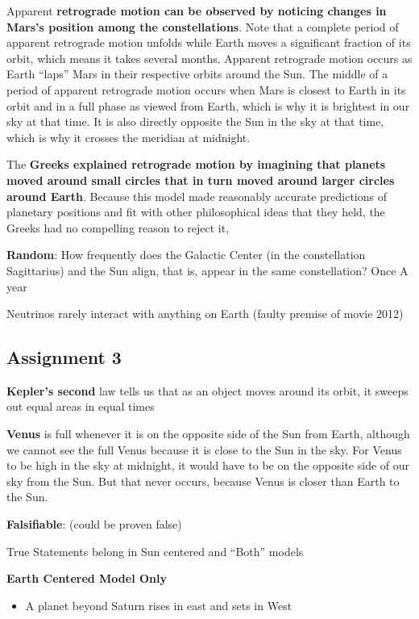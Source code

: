 Apparent {\bf retrograde motion can be observed by noticing changes in Mars's position among the constellations}. Note that a complete period of apparent retrograde motion unfolds while Earth moves a significant fraction of its orbit, which means it takes several months. Apparent retrograde motion occurs as Earth ``laps'' Mars in their respective orbits around the Sun. The middle of a period of apparent retrograde motion occurs when Mars is closest to Earth in its orbit and in a full phase as viewed from Earth, which is why it is brightest in our sky at that time. It is also directly opposite the Sun in the sky at that time, which is why it crosses the meridian at midnight.

The {\bf Greeks explained retrograde motion by imagining that planets moved around small circles that in turn moved around larger circles around Earth}. Because this model made reasonably accurate predictions of planetary positions and fit with other philosophical ideas that they held, the Greeks had no compelling reason to reject it,

{\bf Random}: How frequently does the Galactic Center (in the constellation Sagittarius) and the Sun align, that is, appear in the same constellation? Once A year

Neutrinos rarely interact with anything on Earth (faulty premise of movie 2012)

\subsection{Assignment 3}
{\bf Kepler's second} law tells us that as an object moves around its orbit, it sweeps out equal areas in equal times

{\bf Venus} is full whenever it is on the opposite side of the Sun from Earth, although we cannot see the full Venus because it is close to the Sun in the sky. For Venus to be high in the sky at midnight, it would have to be on the opposite side of our sky from the Sun. But that never occurs, because Venus is closer than Earth to the Sun.

{\bf Falsifiable}: (could be proven false)

True Statements belong in Sun centered and ``Both'' models

{\bf Earth Centered Model Only}
\begin{itemize}
\item A planet beyond Saturn rises in east and sets in West
\end{itemize}

